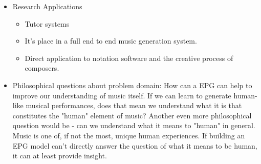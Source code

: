 \begin{itemize}
    \item Research Applications 
    \begin{itemize}
        \item Tutor systems 
        \item It's place in a full end to end music generation system. 
        \item Direct application to notation software and the creative process of composers. 
    \end{itemize}
    \item Philosophical questions about problem domain: How can a EPG can help to improve our understanding of music itself. If we can learn to generate human-like musical performances, does that mean we understand what it is that constitutes the "human" element of music? Another even more philosophical question would be - can we understand what it means to "human" in general. Music is one of, if not the most, unique human experiences. If building an EPG model can't directly answer the question of what it means to be human, it can at least provide insight. 
\end{itemize}
